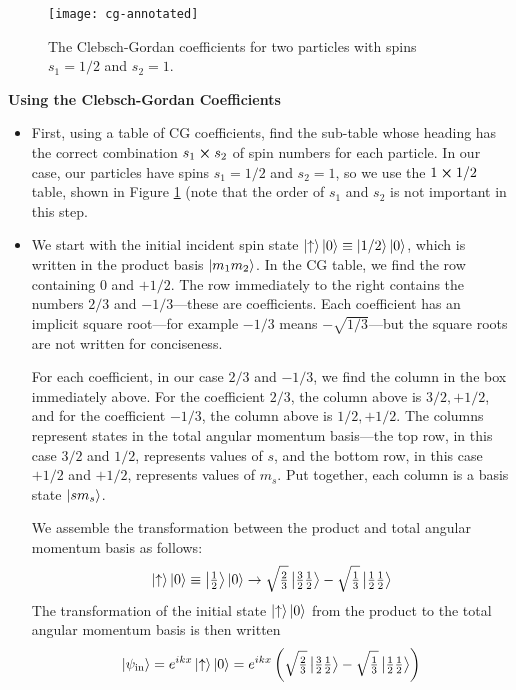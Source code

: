 \documentclass[11pt, a4paper]{article}
\newcommand{\ua}{\uparrow}  %
\begin{document}
\begin{figure}[hbtb!]
\centering
\texttt{[image: cg-annotated]}
\caption{The Clebsch-Gordan coefficients for two particles with spins $ s_{1} = 1/2 $ and $ s_{2} = 1 $.}
\label{fig:cg}
\end{figure}
	
	
\textbf{Using the Clebsch-Gordan Coefficients}	
\begin{itemize}
	\item First, using a table of CG coefficients, find the sub-table whose heading has the correct combination $ s_{1} \cross s_{2} $ of spin numbers for each particle. In our case, our particles have spins $ s_{1} = 1/2 $ and $ s_{2} = 1 $, so we use the $ 1 \cross 1/2 $ table, shown in Figure \ref{fig:cg} (note that the order of $ s_{1} $ and $ s_{2} $ is not important in this step.
	
	\item We start with the initial incident spin state $ \ket{\ua}\ket{0} \equiv \ket{1/2}\ket{0} $, which is written in the product basis $ \ket{m_{1}m_{2}} $. In the CG table, we find the row containing $ 0 $ and $ +1/2 $. The row immediately to the right contains the numbers $ 2/3 $ and $ -1/3 $---these are coefficients. Each coefficient has an implicit square root---for example $ -1/3 $ means $ -\sqrt{1/3} $---but the square roots are not written for conciseness. 
	
	For each coefficient, in our case $ 2/3 $ and $ -1/3 $, we find the column in the box immediately above. For the coefficient $ 2/3 $, the column above is $ 3/2, +1/2 $, and for the coefficient $ -1/3 $, the column above is $ 1/2, +1/2 $. The columns represent states in the total angular momentum basis---the top row, in this case $ 3/2 $ and $ 1/2 $, represents values of $ s $, and the bottom row, in this case $ +1/2 $ and $ +1/2 $, represents values of $ m_{s} $. Put together, each column is a basis state $ \ket{sm_{s}} $.

	We assemble the transformation between the product and total angular momentum basis as follows:
	\begin{equation*}
		\ket{\ua} \ket{0} \equiv \ket{\tfrac{1}{2}}\ket{0} \to \sqrt{\tfrac{2}{3}} \ket{\tfrac{3}{2}\tfrac{1}{2}} - \sqrt{\tfrac{1}{3}}\ket{\tfrac{1}{2}\tfrac{1}{2}}
	\end{equation*}
	The transformation of the initial state $ \ket{\ua}\ket{0} $ from the product to the total angular momentum basis is then written
	\begin{equation*}
		\ket{\psi_{\text{in}}} = e^{ikx}\ket{\ua} \ket{0} = e^{ikx}\left(\sqrt{\tfrac{2}{3}} \ket{\tfrac{3}{2}\tfrac{1}{2}} - \sqrt{\tfrac{1}{3}}\ket{\tfrac{1}{2}\tfrac{1}{2}}\right)
	\end{equation*}
	

\end{itemize}
\end{document}
